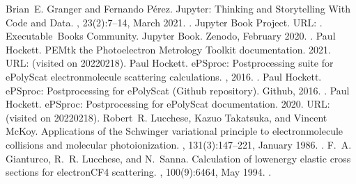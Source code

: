 \documentclass[letterpaper,table,10pt,english]{jupyterBook}
\begin{document}
\begin{sphinxthebibliography}{10}
\sphinxAtStartPar
Brian E. Granger and Fernando Pérez. Jupyter: Thinking and Storytelling With Code and Data. , 23(2):7–14, March 2021. .
\sphinxAtStartPar
Jupyter Book Project. URL: .
\sphinxAtStartPar
Executable Books Community. Jupyter Book. Zenodo, February 2020. .
\sphinxAtStartPar
Paul Hockett. PEMtk \sphinxhyphen{} the Photoelectron Metrology Toolkit \sphinxhyphen{} documentation. 2021. URL:  (visited on 2022\sphinxhyphen{}02\sphinxhyphen{}18).
\sphinxAtStartPar
Paul Hockett. ePSproc: Post\sphinxhyphen{}processing suite for ePolyScat electron\sphinxhyphen{}molecule scattering calculations. , 2016. .
\sphinxAtStartPar
Paul Hockett. ePSproc: Post\sphinxhyphen{}processing for ePolyScat (Github repository). Github, 2016. .
\sphinxAtStartPar
Paul Hockett. ePSproc: Post\sphinxhyphen{}processing for ePolyScat documentation. 2020. URL:  (visited on 2022\sphinxhyphen{}02\sphinxhyphen{}18).
\sphinxAtStartPar
Robert R. Lucchese, Kazuo Takatsuka, and Vincent McKoy. Applications of the Schwinger variational principle to electron\sphinxhyphen{}molecule collisions and molecular photoionization. , 131(3):147–221, January 1986. .
\sphinxAtStartPar
F. A. Gianturco, R. R. Lucchese, and N. Sanna. Calculation of low\sphinxhyphen{}energy elastic cross sections for electron\sphinxhyphen{}CF4 scattering. , 100(9):6464, May 1994. .
\sphinxAtStartPar

\end{sphinxthebibliography}
\end{document}
